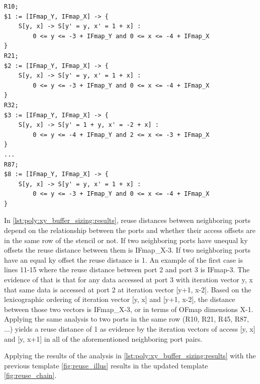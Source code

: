 \clearpage 

\begin{lstlisting}[caption=Polyhedral analysis of reuse in iscc for convolution loops, label={lst:poly:xy_buffer_sizing:results}]
R10;
$1 := [IFmap_Y, IFmap_X] -> { 
    S[y, x] -> S[y' = y, x' = 1 + x] : 
        0 <= y <= -3 + IFmap_Y and 0 <= x <= -4 + IFmap_X 
}
R21;
$2 := [IFmap_Y, IFmap_X] -> { 
    S[y, x] -> S[y' = y, x' = 1 + x] : 
        0 <= y <= -3 + IFmap_Y and 0 <= x <= -4 + IFmap_X 
}
R32;
$3 := [IFmap_Y, IFmap_X] -> { 
    S[y, x] -> S[y' = 1 + y, x' = -2 + x] : 
        0 <= y <= -4 + IFmap_Y and 2 <= x <= -3 + IFmap_X 
}
...
R87;
$8 := [IFmap_Y, IFmap_X] -> { 
    S[y, x] -> S[y' = y, x' = 1 + x] : 
        0 <= y <= -3 + IFmap_Y and 0 <= x <= -4 + IFmap_X 
}
\end{lstlisting}

In \ref{lst:poly:xy_buffer_sizing:results}, reuse distances between neighboring
ports depend on the relationship between the ports and whether their access offsets
are in the same row of the stencil or not. If two neighboring ports have unequal
ky offsets the reuse distance between them is IFmap\_X-3. If two neighboring
ports have an equal ky offset the reuse distance is 1. An example of the first
case is lines 11-15 where the reuse distance between port 2 and port 3 is
IFmap-3. The evidence of that is that for any data accessed at port 3 with
iteration vector y, x that same data is accessed at port 2 at iteration vector
[y+1, x-2]. Based on the lexicographic ordering of iteration vector [y, x] and [y+1,
x-2], the distance between those two vectors is IFmap\_X-3, or in terms of OFmap
dimensions X-1. Applying the same analysis to two ports in the same row (R10,
R21, R45, R87, ...) yields a reuse distance of 1 as evidence by the iteration
vectors of access [y, x] and [y, x+1] in all of the aforementioned neighboring
port pairs. 

Applying the results of the analysis in
\autoref{lst:poly:xy_buffer_sizing:results} with the previous template \autoref{fig:reuse_illus}
results in the updated template \autoref{fig:reuse_chain}.

